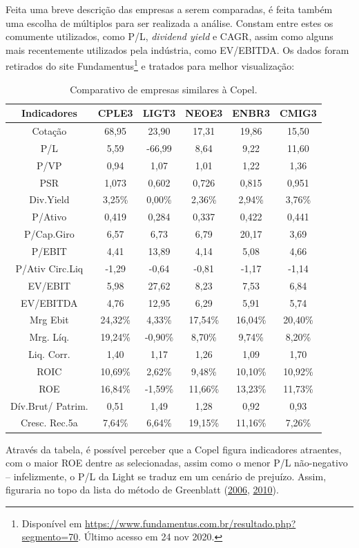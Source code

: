 \documentclass[grad,numbers]{coppe}
\begin{document}
  Feita uma breve descrição das empresas a serem comparadas, é feita também uma escolha de múltiplos para ser realizada a análise. Constam entre estes os comumente utilizados, como P/L, \emph{dividend yield} e CAGR, assim como alguns mais recentemente utilizados pela indústria, como EV/EBITDA. Os dados foram retirados do site Fundamentus\footnote{Disponível em \url{https://www.fundamentus.com.br/resultado.php?segmento=70}. Último acesso em 24 nov 2020.} e tratados para melhor visualização:
  \begin{table}[H]

  \caption{\label{tab:unnamed-chunk-19}Comparativo de empresas similares à Copel.}
  \centering
  \begin{tabular}[t]{cccccc}
  \toprule
  Indicadores & CPLE3 & LIGT3 & NEOE3 & ENBR3 & CMIG3\\
  \midrule
  Cotação & 68,95 & 23,90 & 17,31 & 19,86 & 15,50\\
  P/L & 5,59 & -66,99 & 8,64 & 9,22 & 11,60\\
  P/VP & 0,94 & 1,07 & 1,01 & 1,22 & 1,36\\
  PSR & 1,073 & 0,602 & 0,726 & 0,815 & 0,951\\
  Div.Yield & 3,25\% & 0,00\% & 2,36\% & 2,94\% & 3,76\%\\
  \addlinespace
  P/Ativo & 0,419 & 0,284 & 0,337 & 0,422 & 0,441\\
  P/Cap.Giro & 6,57 & 6,73 & 6,79 & 20,17 & 3,69\\
  P/EBIT & 4,41 & 13,89 & 4,14 & 5,08 & 4,66\\
  P/Ativ Circ.Liq & -1,29 & -0,64 & -0,81 & -1,17 & -1,14\\
  EV/EBIT & 5,98 & 27,62 & 8,23 & 7,53 & 6,84\\
  \addlinespace
  EV/EBITDA & 4,76 & 12,95 & 6,29 & 5,91 & 5,74\\
  Mrg Ebit & 24,32\% & 4,33\% & 17,54\% & 16,04\% & 20,40\%\\
  Mrg. Líq. & 19,24\% & -0,90\% & 8,70\% & 9,74\% & 8,20\%\\
  Liq. Corr. & 1,40 & 1,17 & 1,26 & 1,09 & 1,70\\
  ROIC & 10,69\% & 2,62\% & 9,48\% & 10,10\% & 10,92\%\\
  \addlinespace
  ROE & 16,84\% & -1,59\% & 11,66\% & 13,23\% & 11,73\%\\
  Dív.Brut/ Patrim. & 0,51 & 1,49 & 1,28 & 0,92 & 0,93\\
  Cresc. Rec.5a & 7,64\% & 6,64\% & 19,15\% & 11,16\% & 7,26\%\\
  \bottomrule
  \end{tabular}
  \end{table}
  Através da tabela, é possível perceber que a Copel figura indicadores atraentes, com o maior ROE dentre as selecionadas, assim como o menor P/L não-negativo -- infelizmente, o P/L da Light se traduz em um cenário de prejuízo. Assim, figuraria no topo da lista do método de Greenblatt (\protect\hyperlink{ref-greenblatt2006}{2006}, \protect\hyperlink{ref-greenblatt2010}{2010}).
\end{document}
